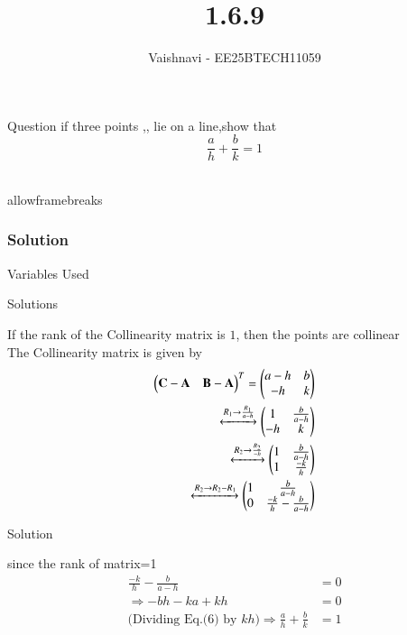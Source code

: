 \documentclass{beamer}
\title %
{1.6.9}
\author %
{Vaishnavi - EE25BTECH11059}
\begin{document}
\frame{\titlepage}
\begin{frame}{Question}
if three points ,, lie on a line,show that
\[
\frac{a}{h} + \frac{b}{k} = 1
\]
\\
 

\end{frame}
\begin{frame}{allowframebreaks}
\frametitle{Solution}
\begin{table}[H]    
  \centering
  
  \caption{Variables Used}
  \label{tab:1.6.9}
\end{table}

\end{frame}
\begin{frame}{Solutions}

If the rank of the Collinearity matrix is $1$, then the points are collinear\\
   The Collinearity matrix is given by\\
\begin{align}
    \begin{pmatrix}
    \mathbf{C}-\mathbf{A} & \mathbf{B}-\mathbf{A}
  \end{pmatrix}^T = \begin{pmatrix}
    a-h & b
    \\
    -h & k
    \end{pmatrix}\\
  \xleftrightarrow[]{R_1 \rightarrow {\frac{R_1}{a-h}}}
 \begin{pmatrix}
    1 & \frac{b}{a-h}
    \\
    -h & k
    \end{pmatrix}\\
     \xleftrightarrow[]{R_2 \rightarrow {\frac{R_2}{-h}}}
 \begin{pmatrix}
     1 & \frac{b}{a-h}
    \\
     1 & \frac{-k}{h}
    \end{pmatrix}\\
       \xleftrightarrow[]{R_2 \rightarrow R_2- R_1}
 \begin{pmatrix}
    1 & \frac{b}{a-h}
    \\
    0 & \frac{-k}{h}-\frac{b}{a-h}
      \end{pmatrix} 
\end{align}

\end{frame}


\begin{frame}{Solution}
    
since the rank of matrix=1
\begin{align}
    \frac{-k}{h} - \frac{b}{a - h} &= 0 \label{eq1} \\
    \Rightarrow -bh - ka + kh &= 0 \label{eq2} \\
    \text{(Dividing Eq.(6) by $kh$)} 
    \Rightarrow \frac{a}{h} + \frac{b}{k} &= 1 \label{eq3}
\end{align}
\end{frame}
\end{document}
